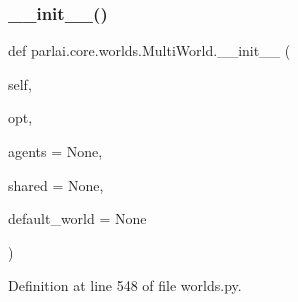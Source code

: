 \subsubsection{\texorpdfstring{\+\_\+\+\_\+init\+\_\+\+\_\+()}{\_\_init\_\_()}}
{\footnotesize\ttfamily def parlai.\+core.\+worlds.\+Multi\+World.\+\_\+\+\_\+init\+\_\+\+\_\+ (\begin{DoxyParamCaption}\item[{}]{self,  }\item[{}]{opt,  }\item[{}]{agents = {\ttfamily None},  }\item[{}]{shared = {\ttfamily None},  }\item[{}]{default\+\_\+world = {\ttfamily None} }\end{DoxyParamCaption})}



Definition at line 548 of file worlds.\+py.



